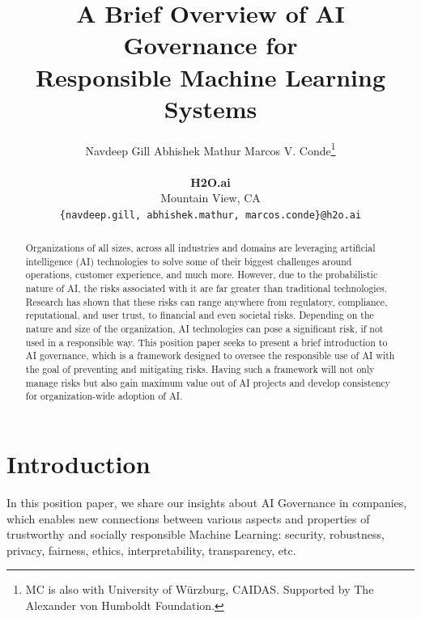 \documentclass{article}
\title{A Brief Overview of AI Governance for\\Responsible Machine Learning Systems}
\author{%
  Navdeep Gill \quad Abhishek Mathur \quad Marcos V. Conde\thanks{MC is also with University of Würzburg, CAIDAS. Supported by The Alexander von Humboldt Foundation.}\\
    \\
  \textbf{H2O.ai}\\
  Mountain View, CA\\
  \texttt{\{navdeep.gill, abhishek.mathur, marcos.conde\}@h2o.ai} \\
}
\begin{document}
\maketitle


\begin{abstract}
  Organizations of all sizes, across all industries and domains are leveraging artificial intelligence (AI) technologies to solve some of their biggest challenges around operations, customer experience, and much more. However, due to the probabilistic nature of AI, the risks associated with it are far greater than traditional technologies. Research has shown that these risks can range anywhere from regulatory, compliance, reputational, and user trust, to financial and even societal risks. Depending on the nature and size of the organization, AI technologies can pose a significant risk, if not used in a responsible way. This position paper seeks to present a brief introduction to AI governance, which is a framework designed to oversee the responsible use of AI with the goal of preventing and mitigating risks. Having such a framework will not only manage risks but also gain maximum value out of AI projects and develop consistency for organization-wide adoption of AI.

\end{abstract}

\section{Introduction}

In this position paper, we share our insights about AI Governance in companies, which enables new connections between various aspects and properties of trustworthy and socially responsible Machine Learning: security, robustness, privacy, fairness, ethics, interpretability, transparency, etc.
\end{document}
